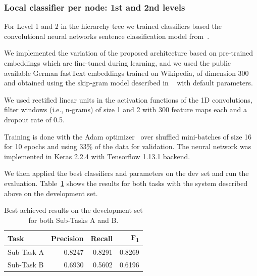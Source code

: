 \documentclass[11pt,a4paper]{article}
\begin{document}
\subsubsection{Local classifier per node: 1st and 2nd levels}

For Level 1 and 2 in the hierarchy tree we trained classifiers based the convolutional
neural networks sentence classification model from~\citet{kim-2014-convolutional}.

We implemented the variation of the proposed architecture based on pre-trained embeddings
which are fine-tuned during learning, and we used the public available German fastText embeddings
trained on Wikipedia, of dimension 300 and obtained using the skip-gram model described in
~\citet{bojanowski-etal-2017-enriching} with default parameters.

We used rectified linear units in the activation functions of the 1D convolutions,
filter windows (i.e., n-grams) of size 1 and 2 with 300 feature maps each and a
dropout rate of 0.5.

Training is done with the Adam optimizer~\cite{journals/corr/KingmaB14} over
shuffled mini-batches of size 16 for 10 epochs and using 33\% of the data for validation.
The neural network was implemented in Keras 2.2.4 with Tensorflow 1.13.1 backend.



We then applied the best classifiers and parameters on the dev set and run the evaluation.
Table~\ref{devset-results} shows the results for both tasks with the system described above on the
development set.

\begin{table}
\begin{center}
\begin{tabular}{|l|r|r|r|}
\hline\centering\textbf{Task}  & \textbf{Precision} &  \textbf{Recall} &  \textbf{F\textsubscript{1}}\\
\hline
 Sub-Task A   & 0.8247 & 0.8291 & 0.8269 \\
 Sub-Task B   & 0.6930 & 0.5602 & 0.6196 \\
\hline
\end{tabular}
\end{center}
\caption{\label{devset-results} Best achieved results on the development set for both Sub-Tasks A and B.}
\end{table}
\end{document}
